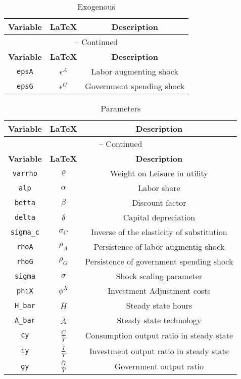 \begin{center}
\begin{longtable}{ccc}
\caption{Exogenous}\\%
\hline%
\multicolumn{1}{c}{\textbf{Variable}} &
\multicolumn{1}{c}{\textbf{\LaTeX}} &
\multicolumn{1}{c}{\textbf{Description}}\\%
\hline\hline%
\endfirsthead
\multicolumn{3}{c}{{\tablename} \thetable{} -- Continued}\\%
\hline%
\multicolumn{1}{c}{\textbf{Variable}} &
\multicolumn{1}{c}{\textbf{\LaTeX}} &
\multicolumn{1}{c}{\textbf{Description}}\\%
\hline\hline%
\endhead
\texttt{epsA} & ${\epsilon^{A}}$ & Labor augmenting shock\\
\texttt{epsG} & ${\epsilon^{G}}$ & Government spending shock\\
\hline%
\end{longtable}
\end{center}
\begin{center}
\begin{longtable}{ccc}
\caption{Parameters}\\%
\hline%
\multicolumn{1}{c}{\textbf{Variable}} &
\multicolumn{1}{c}{\textbf{\LaTeX}} &
\multicolumn{1}{c}{\textbf{Description}}\\%
\hline\hline%
\endfirsthead
\multicolumn{3}{c}{{\tablename} \thetable{} -- Continued}\\%
\hline%
\multicolumn{1}{c}{\textbf{Variable}} &
\multicolumn{1}{c}{\textbf{\LaTeX}} &
\multicolumn{1}{c}{\textbf{Description}}\\%
\hline\hline%
\endhead
\texttt{varrho} & ${\varrho}$ & Weight on Leisure in utility\\
\texttt{alp} & ${\alpha}$ & Labor share\\
\texttt{betta} & ${\beta}$ & Discount factor\\
\texttt{delta} & ${\delta}$ & Capital depreciation\\
\texttt{sigma\_c} & ${\sigma_{C}}$ & Inverse of the elasticity of substitution\\
\texttt{rhoA} & ${\rho_{A}}$ & Persistence of labor augmentig shock\\
\texttt{rhoG} & ${\rho_{G}}$ & Persistence of government spending shock\\
\texttt{sigma} & ${\sigma}$ & Shock scaling parameter\\
\texttt{phiX} & ${\phi^X}$ & Investment Adjustment costs\\
\texttt{H\_bar} & $\bar{H}$ & Steady state hours\\
\texttt{A\_bar} & $\bar{A}$ & Steady state technology\\
\texttt{cy} & $\frac{\bar{C}}{\bar{Y}}$ & Consumption output ratio in steady state\\
\texttt{iy} & $\frac{\bar{I}}{\bar{Y}}$ & Investment output ratio in steady state\\
\texttt{gy} & $\frac{\bar{G}}{\bar{Y}}$ & Government output ratio\\
\hline%
\end{longtable}
\end{center}
